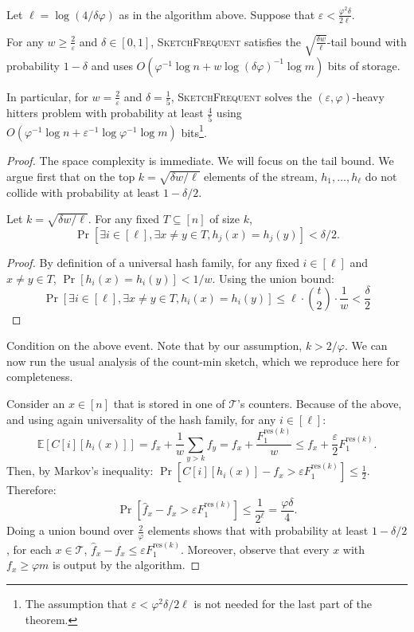 \documentclass[sigconf,review=true,anonymous=true,screen]{acmart}
\newcommand{\ignore}[1]{}
\newcommand{\eps}{\varepsilon}
\renewcommand{\phi}{\varphi}
\begin{document}
\begin{theorem}
Let $\ell = \log(4/\delta \varphi)$ as in the algorithm above.  Suppose that $\eps < \frac{\varphi^2 \delta}{2\ell}$. 

For any $w \geq \frac2\eps$ and $\delta \in [0,1]$,  \textsc{SketchFrequent} satisfies the $\sqrt{\frac{\delta w}{\ell}}$-tail bound with probability $1-\delta$ 
and uses 
$O(\varphi^{-1} \log n + w \log (\delta\phi)^{-1} \log m)$ bits of storage.

In particular, for $w = \frac2\eps$ and $\delta=\frac15$, \textsc{SketchFrequent} solves the $(\eps,\phi)$-heavy hitters problem with probability at least $\frac45$ using $O(\varphi^{-1}\log n + \eps^{-1} \log \phi^{-1} \log m)$ bits\footnote{The assumption that $\eps <\varphi^2\delta/2\ell$ is not needed for the last part of the theorem.}.
\ignore{
solves the $(\phi, \eps)$-Heavy hitters problem. In particular, for any $0 \leq k \leq \sqrt{\delta w/\ell}$, with probability at least $1-\delta$, for any $(x, \hat{f}_x)$ reported by the algorithm,
$$0 \leq \hat{f}_x - f_x \leq \eps F_1^{\text{res}(k)}.$$
The algorithm uses $O(\phi^{-1} \log  n + \eps^{-1} \log \phi^{-1} \log m)$ bits of storage.}
\end{theorem}
\begin{proof}The space complexity is immediate. We will focus on the tail bound.
We argue first that on the top $k=\sqrt{\delta w/\ell}$ elements of the stream, $h_1, \dots, h_\ell$ do not collide with probability at least $1-\delta/2$.
\begin{lemma}
Let $k = \sqrt{\delta w/\ell}$. For any fixed $T \subseteq [n]$ of size $k$,
$$\Pr[\exists i \in [\ell], \exists x \neq y \in T, h_j(x)=h_j(y)] < \delta/2.$$
\end{lemma}
\begin{proof}
By definition of a universal hash family, for any fixed $i \in [\ell]$ and $x \neq y \in T$, $\Pr[h_i(x)=h_i(y)]<1/w$. Using the union bound:
$$\Pr[\exists i \in [\ell], \exists x \neq y \in T, h_i(x)=h_i(y)] \leq \ell \cdot {t \choose 2} \cdot \frac1w < \frac{\delta}{2}$$
\end{proof}
Condition on the above event. Note that by our assumption, $k>2/\varphi$. We can now run the usual analysis of the count-min sketch, which we reproduce here for completeness. 

Consider an $x \in [n]$ that is stored in one of $\mathcal{T}$'s counters. Because of the above, and using again universality of the hash family, for any $i \in [\ell]$:
$$\mathbb{E}[C[i][h_i(x)]] = f_x + \frac1w\sum_{y>k} f_y = f_x + \frac{F_1^{\text{res}(k)}}{w} \leq f_x + \frac{\eps}{2} F_1^{\text{res}(k)}.$$
Then, by Markov's inequality:
$\Pr[C[i][h_i(x)]-f_x > \eps F_1^{\text{res}(k)}] \leq \frac12$. Therefore:
$$\Pr[\hat{f}_x - f_x > \eps F_1^{\text{res}(k)}] \leq \frac{1}{2^\ell} = \frac{\phi\delta}{4}.$$
Doing a union bound over $\frac2\varphi$ elements shows that with probability at least $1-\delta/2$, for each $x \in \mathcal{T}$,
$\hat{f}_x - f_x \leq \eps F_1^{\text{res}(k)}$. Moreover, observe that every $x$ with $f_x \geq \varphi m$ is output by the algorithm.
\end{proof}
\end{document}
